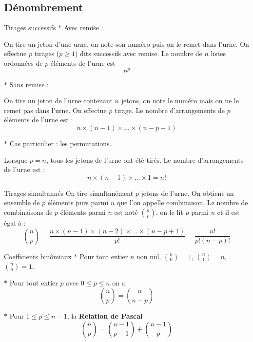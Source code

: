 \subsection{Dénombrement}

\begin{bclogo}{Tirages successifs}
$\ast$ Avec remise :

On tire un jeton d'une urne, on note son numéro puis on le remet dans l'urne. On effectue $p$ tirages ($p\geqslant1$) dits successifs avec remise. Le nombre de $n$ listes ordonnées de $p$ éléments de l'urne est \[n^p\]

$\ast$ Sans remise : 

On tire un jeton de l'urne contenant $n$ jetons, on note le numéro mais on ne le remet pas dans l'urne. On effectue $p$ tirage. Le nombre d'arrangements de $p$ éléments de l'urne est : \[n\times (n-1)\times ...\times (n-p+1)\]

$\ast$ Cas particulier : les permutations. 

Lorsque $p=n$, tous les jetons de l'urne ont été tirés. Le nombre d'arrangements de l'urne est : \[n\times (n-1)\times ...\times 1=n!\]
\end{bclogo}

\medskip

\begin{bclogo}{Tirages simultannés}
On tire simultanément $p$ jetons de l'urne. On obtient un ensemble de $p$ éléments purs parmi $n$ que l'on appelle combinaison. Le nombre de combinaisons de $p$ éléments parmi $n$ est noté $\binom{n}{p}$, on le lit $p$ parmi $n$ et il est égal à : \[\binom{n}{p} =\frac{n\times (n-1)\times (n-2)\times \ldots\times (n-p+1)}{p!}=\frac{n!}{p!(n-p)!}\]

\end{bclogo}

\medskip

\begin{bclogo}{Coefficients binômiaux}
$\ast$ Pour tout entier $n$ non nul, $\binom{n}{0}=1$, $\binom{n}{1}=n$, $\binom{n}{n}=1$.

$\ast$ Pour tout entier $p$ avec $0\leqslant p\leqslant n$ on a \[\binom{n}{p}=\binom{n}{n-p}\]

$\ast$ Pour $1\leqslant p\leqslant n-1$, la \textbf{Relation de Pascal} \[\binom{n}{p}=\binom{n-1}{p-1}+\binom{n-1}{p}\]
\end{bclogo}

\medskip

